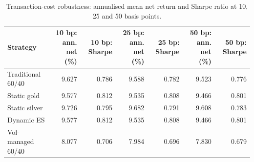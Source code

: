 \begin{table}[htbp]
\centering
\caption{Transaction-cost robustness: annualised mean net return and Sharpe ratio at 10, 25 and 50 basis points.}
\label{tab:robustness}
\begin{tabular}{lrrrrrr}
\toprule
Strategy & 10 bp: ann. net (\%) & 10 bp: Sharpe & 25 bp: ann. net (\%) & 25 bp: Sharpe & 50 bp: ann. net (\%) & 50 bp: Sharpe \\
\midrule
Traditional 60/40 & 9.627 & 0.786 & 9.588 & 0.782 & 9.523 & 0.776 \\
Static gold & 9.577 & 0.812 & 9.535 & 0.808 & 9.466 & 0.801 \\
Static silver & 9.726 & 0.795 & 9.682 & 0.791 & 9.608 & 0.783 \\
Dynamic ES & 9.577 & 0.812 & 9.535 & 0.808 & 9.466 & 0.801 \\
Vol-managed 60/40 & 8.077 & 0.706 & 7.984 & 0.696 & 7.830 & 0.679 \\
\bottomrule
\end{tabular}
\end{table}
